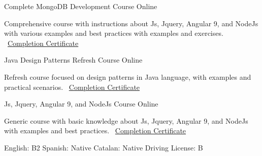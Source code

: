 \documentclass[]{awesome-cv}
\begin{document}
\begin{cventries}
	\cventry
	{}
	{Complete MongoDB Development Course \vspace{-4mm}}
	{Online \vspace{-5mm}}
	{}
	{\begin{sectionnormaltext} 
		\item{Comprehensive course with instructions about Js, Jquery, Angular 9, and NodeJs with various examples and best practices with examples and exercises.
		\newline \vspace{2mm} \faLink\ \href{https://www.udemy.com/certificate/UC-b990e98a-9b76-44b1-8e3e-43b68213725c/}{Completion Certificate}}
	\end{sectionnormaltext}}
    {}
    
	\cventry
	{}
	{Java Design Patterns Refresh Course \vspace{-4mm}}
	{Online \vspace{-5mm}}
	{}
	{\begin{sectionnormaltext} 
		\item{Refresh course focused on design patterns in Java language, with examples and practical scenarios.
		\newline \vspace{2mm} \faLink\ \href{https://www.udemy.com/certificate/UC-982e3338-ea7d-4434-bf27-af8e38b77bd5/}{Completion Certificate}}
	\end{sectionnormaltext}}
    {}

    
	\cventry
	{}
	{Js, Jquery, Angular 9, and NodeJs Course \vspace{-4mm}}
	{Online \vspace{-5mm}}
	{}
	{\begin{sectionnormaltext} 
		\item{Generic course with basic knowledge about Js, Jquery, Angular 9, and NodeJs with examples and best practices.
		\newline \vspace{2mm} \faLink\ \href{https://www.udemy.com/certificate/UC-012febdf-7657-4e65-8708-ee4e18d5a8e1/}{Completion Certificate}}
	\end{sectionnormaltext}}
    {}
\end{cventries}

\vspace{-5mm}
\begin{cventries}
	\vspace{-8mm}
	\cventry
	{}
	{}
	{}
	{}
	{\begin{sectionnormaltext} 
	   \item{English: B2 
      \newline Spanish: Native 
      \newline  Catalan: Native 
      \newline  Driving License: B}
	\end{sectionnormaltext}}
\end{cventries}
\end{document}
